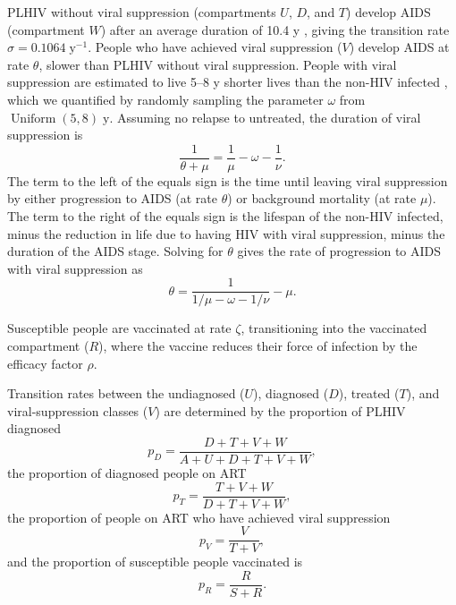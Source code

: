 \documentclass[11pt]{article}
\DeclareMathOperator{\Uniform}{Uniform}
\begin{document}
PLHIV without viral suppression (compartments $U$, $D$, and $T$)
develop AIDS (compartment $W$) after an average duration of 10.4 y
\cite{Morgan2002-cq}, giving the transition rate
$\sigma = 0.1064\;\text{y$^{-1}$}$.  People who have achieved viral
suppression ($V$) develop AIDS at rate $\theta$, slower than PLHIV
without viral suppression.  People with viral suppression are
estimated to live 5--8 y shorter lives than the non-HIV infected
\cite{Unaids2014-ue, Samji2013-kf}, which we quantified by randomly
sampling the parameter $\omega$ from $\Uniform(5, 8)\;\text{y}$.
Assuming no relapse to untreated, the duration of viral suppression is
\begin{equation}
  \frac{1}{\theta + \mu} = \frac{1}{\mu} - \omega - \frac{1}{\nu}.
\end{equation}
The term to the left of the equals sign is the time until leaving
viral suppression by either progression to AIDS (at rate $\theta$) or
background mortality (at rate $\mu$).  The term to the right of the
equals sign is the lifespan of the non-HIV infected, minus the
reduction in life due to having HIV with viral suppression, minus the
duration of the AIDS stage.  Solving for $\theta$ gives the rate of
progression to AIDS with viral suppression as
\begin{equation}
  \label{theta}
  \theta = \frac{1}{1/\mu - \omega - 1/\nu} - \mu.
\end{equation}

Susceptible people are vaccinated at rate $\zeta$, transitioning into
the vaccinated compartment ($R$), where the vaccine reduces their
force of infection by the efficacy factor $\rho$.

Transition rates between the undiagnosed ($U$), diagnosed ($D$),
treated ($T$), and viral-suppression classes ($V$) are determined by
the proportion of PLHIV diagnosed
\begin{equation}
  p_D = \frac{D + T + V + W}{A + U + D + T + V + W},
\end{equation}
the proportion of diagnosed people on ART
\begin{equation}
  p_T = \frac{T + V + W}{D + T + V + W},
\end{equation}
the proportion of people on ART who have
achieved viral suppression
\begin{equation}
  p_V = \frac{V}{T + V},
\end{equation}
and the proportion of susceptible people vaccinated is
\begin{equation}
  p_R = \frac{R}{S + R}.
\end{equation}
\end{document}
